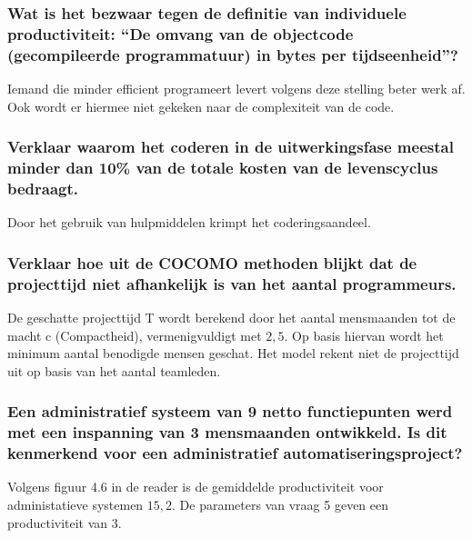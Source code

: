 \documentclass[a4paper,titlepage]{artikel1}
\begin{document}
   \subsubsection[Opdracht 2]{Wat is het bezwaar tegen de definitie van
   individuele productiviteit: ``De omvang van de objectcode
   (gecompileerde programmatuur) in bytes per tijdseenheid''?}
   Iemand die minder efficient programeert levert volgens deze stelling beter werk af. Ook wordt er hiermee niet gekeken naar de complexiteit van de code.
   
   \subsubsection[Opdracht 3]{Verklaar waarom het coderen in de
   uitwerkingsfase meestal minder dan 10\% van de totale kosten van de levenscyclus bedraagt.}
   Door het gebruik van hulpmiddelen krimpt het coderingsaandeel.
   
   \subsubsection[Opdracht 4]{Verklaar hoe uit de COCOMO methoden blijkt dat de projecttijd niet afhankelijk is van het aantal programmeurs.}
   De geschatte projecttijd T wordt berekend door het aantal mensmaanden tot de macht c (Compactheid), vermenigvuldigt met $2,5$. Op basis hiervan wordt het minimum aantal benodigde mensen geschat. Het model rekent niet de projecttijd uit op basis van het aantal teamleden.

   \subsubsection[Opdracht 5]{Een administratief systeem van 9 netto
   functiepunten werd met een inspanning van 3 mensmaanden
   ontwikkeld. Is dit kenmerkend voor een administratief
   automatiseringsproject?}
   Volgens figuur 4.6 in de reader is de gemiddelde productiviteit voor administatieve systemen $15,2$. De parameters van vraag 5 geven een productiviteit van $3$.
\end{document}
